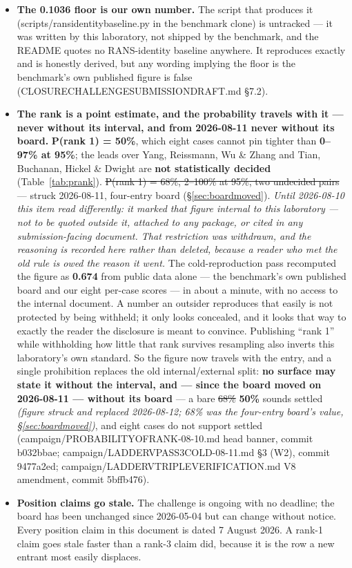 \documentclass[11pt,a4paper]{article}
\newcommand{\breakus}{\textunderscore\allowbreak}
\newcommand{\code}[1]{{\small\ttfamily\let\_\breakus #1}}
\newcommand{\artifact}[1]{{\footnotesize\ttfamily\let\_\breakus #1}}
\begin{document}
\begin{itemize}
\item \textbf{The 0.1036 floor is our own number.} The script that produces it
  (\code{scripts/rans\_identity\_baseline.py} in the benchmark clone) is untracked --- it
  was written by this laboratory, not shipped by the benchmark, and the README quotes no
  RANS-identity baseline anywhere. It reproduces exactly and is honestly derived, but any
  wording implying the floor is the benchmark's own published figure is false
  (\artifact{CLOSURE\_CHALLENGE\_SUBMISSION\_DRAFT.md} \S7.2).
\item \textbf{The rank is a point estimate, and the probability travels with it ---
never without its interval, and from 2026-08-11 never without its board.}
\textbf{P(rank 1) = 50\%}, which eight cases cannot pin
tighter than \textbf{0--97\% at 95\%}; the leads over Yang, Reissmann, Wu \& Zhang and
Tian, Buchanan, Hickel \& Dwight are
\textbf{not statistically decided} (Table~\ref{tab:prank}).
\sout{P(rank 1) = 68\%, 2--100\% at 95\%, two undecided pairs} --- struck 2026-08-11,
four-entry board (\S\ref{sec:boardmoved}). \emph{Until 2026-08-10 this item
read differently: it marked that figure internal to this laboratory --- not to be quoted
outside it, attached to any package, or cited in any submission-facing document. That
restriction was withdrawn, and the reasoning is recorded here rather than deleted, because a
reader who met the old rule is owed the reason it went.} The cold-reproduction pass
recomputed the figure as \textbf{0.674} from public data alone --- the benchmark's own
published board and our eight per-case scores --- in about a minute, with no access to the
internal document. A number an outsider reproduces that easily is not protected by being
withheld; it only looks concealed, and it looks that way to exactly the reader the
disclosure is meant to convince. Publishing ``rank 1'' while withholding how little that
rank survives resampling also inverts this laboratory's own standard. So the figure now
travels with the entry, and a single prohibition replaces the old internal/external split:
\textbf{no surface may state it without the interval, and --- since the board moved on
2026-08-11 --- without its board} --- a bare \sout{68\%} \textbf{50\%} sounds settled
\emph{(figure struck and replaced 2026-08-12; 68\% was the four-entry board's value,
\S\ref{sec:boardmoved})}, and
eight cases do not support settled
(\artifact{campaign/PROBABILITY\_OF\_RANK\_2026-08-10.md} head banner, commit
\code{b032bbae}; \artifact{campaign/LADDER\_V\_PASS3\_COLD\_2026-08-11.md} \S3 (W2), commit
\code{9477a2ed}; \artifact{campaign/LADDER\_V\_TRIPLE\_VERIFICATION.md} V8 amendment,
commit \code{5bffb476}).
\item \textbf{Position claims go stale.} The challenge is ongoing with no deadline; the
  board has been unchanged since 2026-05-04 but can change without notice. Every position
  claim in this document is dated 7 August 2026. A rank-1 claim goes stale faster than a
  rank-3 claim did, because it is the row a new entrant most easily displaces.
\end{itemize}
\end{document}
